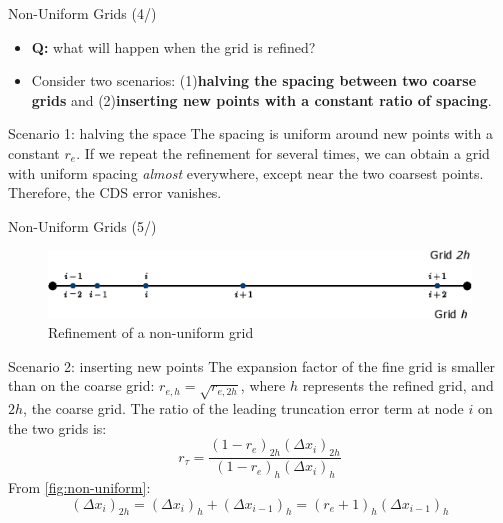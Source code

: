 \begin{frame}{Non-Uniform Grids (4/)}
\begin{itemize}
    \item \textbf{Q:} what will happen when the grid is refined?
    \item Consider two scenarios: (1)\textbf{halving the spacing between two coarse grids} and (2)\textbf{inserting new points with a constant ratio of spacing}.
\end{itemize}
    
\begin{block}{Scenario 1: halving the space}
    The spacing is uniform around new points with a constant $r_{e}$. If we repeat the refinement for several times, we can obtain a grid with uniform spacing \textit{almost} everywhere, except near the two coarsest points. Therefore, the CDS error vanishes.
\end{block}
\end{frame}
\begin{frame}[fragile]{Non-Uniform Grids (5/)}
\begin{figure}
    \centering
    \includegraphics[width=\textwidth]{imgs/non-uniform.eps}
    \caption{Refinement of a non-uniform grid}
    \label{fig:non-uniform}
\end{figure}

\begin{block}{Scenario 2: inserting new points}\small
The expansion factor of the fine grid is smaller than on the coarse grid: $r_{e, h} = \sqrt{r_{e, 2h}}$, where $h$ represents the refined grid, and $2h$, the coarse grid. The ratio of the leading truncation error term at node $i$ on the two grids is:
    \[
    r_{\tau} = \frac{(1-r_{e})_{2h}(\Delta x_{i})_{2h}}{(1-r_{e})_{h}(\Delta x_{i})_{h}}
    \]
From \autoref{fig:non-uniform}:
    \[
    (\Delta x_{i})_{2h} = (\Delta x_{i})_{h} + (\Delta x_{i-1})_{h} = (r_{e}+1)_{h}(\Delta x_{i-1})_{h}
    \]
\end{block}
\end{frame}

